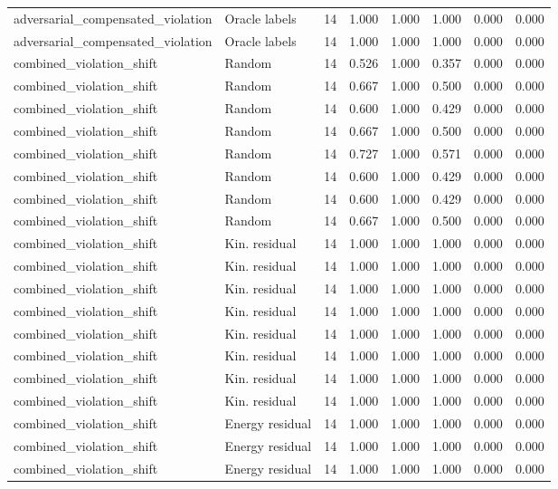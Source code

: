 {\begin{longtable}{llrrrrrr}
adversarial\_compensated\_violation & Oracle labels & 14 & 1.000 & 1.000 & 1.000 & 0.000 & 0.000 \\
adversarial\_compensated\_violation & Oracle labels & 14 & 1.000 & 1.000 & 1.000 & 0.000 & 0.000 \\
combined\_violation\_shift & Random & 14 & 0.526 & 1.000 & 0.357 & 0.000 & 0.000 \\
combined\_violation\_shift & Random & 14 & 0.667 & 1.000 & 0.500 & 0.000 & 0.000 \\
combined\_violation\_shift & Random & 14 & 0.600 & 1.000 & 0.429 & 0.000 & 0.000 \\
combined\_violation\_shift & Random & 14 & 0.667 & 1.000 & 0.500 & 0.000 & 0.000 \\
combined\_violation\_shift & Random & 14 & 0.727 & 1.000 & 0.571 & 0.000 & 0.000 \\
combined\_violation\_shift & Random & 14 & 0.600 & 1.000 & 0.429 & 0.000 & 0.000 \\
combined\_violation\_shift & Random & 14 & 0.600 & 1.000 & 0.429 & 0.000 & 0.000 \\
combined\_violation\_shift & Random & 14 & 0.667 & 1.000 & 0.500 & 0.000 & 0.000 \\
combined\_violation\_shift & Kin. residual & 14 & 1.000 & 1.000 & 1.000 & 0.000 & 0.000 \\
combined\_violation\_shift & Kin. residual & 14 & 1.000 & 1.000 & 1.000 & 0.000 & 0.000 \\
combined\_violation\_shift & Kin. residual & 14 & 1.000 & 1.000 & 1.000 & 0.000 & 0.000 \\
combined\_violation\_shift & Kin. residual & 14 & 1.000 & 1.000 & 1.000 & 0.000 & 0.000 \\
combined\_violation\_shift & Kin. residual & 14 & 1.000 & 1.000 & 1.000 & 0.000 & 0.000 \\
combined\_violation\_shift & Kin. residual & 14 & 1.000 & 1.000 & 1.000 & 0.000 & 0.000 \\
combined\_violation\_shift & Kin. residual & 14 & 1.000 & 1.000 & 1.000 & 0.000 & 0.000 \\
combined\_violation\_shift & Kin. residual & 14 & 1.000 & 1.000 & 1.000 & 0.000 & 0.000 \\
combined\_violation\_shift & Energy residual & 14 & 1.000 & 1.000 & 1.000 & 0.000 & 0.000 \\
combined\_violation\_shift & Energy residual & 14 & 1.000 & 1.000 & 1.000 & 0.000 & 0.000 \\
combined\_violation\_shift & Energy residual & 14 & 1.000 & 1.000 & 1.000 & 0.000 & 0.000 \\

\end{longtable}}
